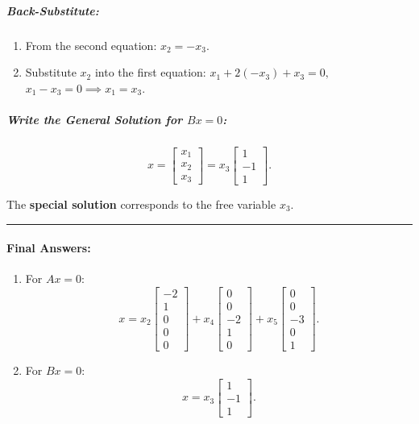 \documentclass[11pt]{article}
\begin{document}
\subparagraph{Back-Substitute:}\label{back-substitute-1}

\begin{enumerate}
\def\labelenumi{\arabic{enumi}.}
\item
  From the second equation: \(x_2 = -x_3.\)
\item
  Substitute \(x_2\) into the first equation:
  \(x_1 + 2(-x_3) + x_3 = 0,\) \(x_1 - x_3 = 0 \implies x_1 = x_3.\)
\end{enumerate}

\subparagraph{\texorpdfstring{Write the General Solution for
\(Bx = 0\):}{Write the General Solution for Bx = 0:}}\label{write-the-general-solution-for-bx-0}

\[
x =
\begin{bmatrix}
x_1 \\ x_2 \\ x_3
\end{bmatrix} =
x_3
\begin{bmatrix}
1 \\ -1 \\ 1
\end{bmatrix}.
\]

The \textbf{special solution} corresponds to the free variable \(x_3\).

\begin{center}\rule{0.5\linewidth}{0.5pt}\end{center}

\paragraph{Final Answers:}\label{final-answers}

\begin{enumerate}
\def\labelenumi{\arabic{enumi}.}
\item
  For \(Ax = 0\): \[
  x =
  x_2
  \begin{bmatrix}
  -2 \\ 1 \\ 0 \\ 0 \\ 0
  \end{bmatrix}
  +
  x_4
  \begin{bmatrix}
  0 \\ 0 \\ -2 \\ 1 \\ 0
  \end{bmatrix}
  +
  x_5
  \begin{bmatrix}
  0 \\ 0 \\ -3 \\ 0 \\ 1
  \end{bmatrix}.
  \]
\item
  For \(Bx = 0\): \[
  x =
  x_3
  \begin{bmatrix}
  1 \\ -1 \\ 1
  \end{bmatrix}.
  \]
\end{enumerate}
\end{document}

